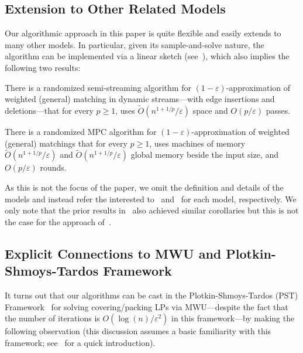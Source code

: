 \documentclass{theoretics}
\renewcommand{\geq}{\geqslant}
\newcommand{\Ot}{\widetilde{O}}
\newcommand{\eps}{\varepsilon}
\begin{document}
\subsection{Extension to Other Related Models}\label{sec:ext-other-models}
 Our algorithmic approach in this paper is quite flexible and easily extends to many other models.  In particular, given its sample-and-solve nature, the algorithm can be implemented via
a linear sketch (see~\cite{AhnGM12}), which also implies the following two results:

\begin{corollary}
There is a randomized semi-streaming algorithm for $(1-\eps)$-approximation of weighted (general) matching in dynamic streams---with edge insertions and deletions---that for every $p \geq 1$, uses $\Ot(n^{1+1/p}/\eps)$ space and $O(p/\eps)$ passes. 
\end{corollary}

\begin{corollary}
There is a randomized MPC algorithm for $(1-\eps)$-approximation of weighted (general) matchings that for every  $p \geq 1$, uses machines of
memory $\Ot(n^{1+1/p}/\eps)$ and $\Ot(n^{1+1/p}/\eps)$  global memory beside the input size, and $O(p/\eps)$ rounds. 
\end{corollary}
As this is not the focus of the paper, we omit the definition and details of the models and instead
refer the interested to~\cite{AhnGM12,McGregor14} and~\cite{KarloffSV10,BeameKS13} for each model, respectively. 
We only note that the prior results in~\cite{AhnG15} also achieved similar corollaries but this is not the case for the approach of~\cite{AssadiJJST22}. 



\subsection{Explicit Connections to MWU and Plotkin-Shmoys-Tardos Framework}\label{sec:MWU}

It turns out that our algorithms can be cast in the Plotkin-Shmoys-Tardos (PST) Framework~\cite{PlotkinST91} for solving covering/packing LPs via MWU---despite the fact that the number of iterations is $O(\log{\!(n)}/\eps^2)$ in this framework---by making the following observation (this discussion assumes 
a basic familiarity with this framework; see~\cite{AroraHK12} for a quick introduction). 
\end{document}

